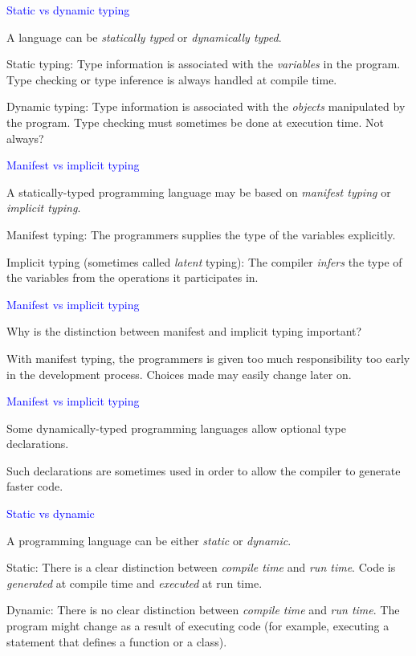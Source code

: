 \documentclass{slides}
\newcommand{\ti}[1]{\begin{center}\Large{\textcolor{blue}{#1}}\end{center}}
\begin{document}
\begin{slide}\ti{Static vs dynamic typing}

A language can be \emph{statically typed} or \emph{dynamically
  typed}.

Static typing: Type information is associated with the
\emph{variables} in the program.  Type checking or type inference is
always handled at compile time.

Dynamic typing: Type information is associated with the \emph{objects}
manipulated by the program.  Type checking must sometimes be done at
execution time.  Not always?

\vfill\end{slide}
\begin{slide}\ti{Manifest vs implicit typing}

A statically-typed programming language may be based on \emph{manifest
  typing} or \emph{implicit typing}.

Manifest typing: The programmers supplies the type of the variables
explicitly.

Implicit typing (sometimes called \emph{latent} typing): The compiler
\emph{infers} the type of the variables from the operations it
participates in.

\vfill\end{slide}
\begin{slide}\ti{Manifest vs implicit typing}

Why is the distinction between manifest and implicit typing important?

With manifest typing, the programmers is given too much responsibility
too early in the development process.  Choices made may easily change
later on.

\vfill\end{slide}
\begin{slide}\ti{Manifest vs implicit typing}

Some dynamically-typed programming languages allow optional type
declarations.

Such declarations are sometimes used in order to allow the compiler to
generate faster code.

\vfill\end{slide}
\begin{slide}\ti{Static vs dynamic}

A programming language can be either \emph{static} or \emph{dynamic}.

Static: There is a clear distinction between \emph{compile time} and
\emph{run time}.  Code is \emph{generated} at compile time and
\emph{executed} at run time.

Dynamic: There is no clear distinction between \emph{compile time} and
\emph{run time}.  The program might change as a result of executing
code (for example, executing a statement that defines a function or a
class).

\vfill\end{slide}
\end{document}
